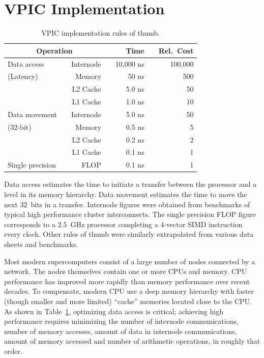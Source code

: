 \documentclass[journal,twoside]{IEEEtran}
\newcommand{\tbl}[1]{Table~\ref{tbl:#1}}
\begin{document}
\section{VPIC Implementation}

\begin{table}
\caption{VPIC implementation rules of thumb.}
\begin{center}
\begin{tabular}{l r r r r r r}
\hline
\hline
\multicolumn{3}{c}{Operation}  & & Time        & & Rel.~Cost \\
\hline
Data access      & & Internode & & 10,000   ns & &   100,000 \\
(Latency)        & &    Memory & &     50   ns & &       500 \\
                 & &  L2 Cache & &      5.0 ns & &        50 \\
\vspace{4pt}     & &  L1 Cache & &      1.0 ns & &        10 \\
Data movement    & & Internode & &      5.0 ns & &        50 \\
(32-bit)         & &    Memory & &      0.5 ns & &         5 \\
                 & &  L2 Cache & &      0.2 ns & &         2 \\
\vspace{4pt}     & &  L1 Cache & &      0.1 ns & &         1 \\
Single precision & &      FLOP & &      0.1 ns & &         1 \\
\hline
\end{tabular}
\end{center}

Data access estimates the time to initiate a transfer between the
processor and a level in its memory hierarchy.  Data movement
estimates the time to move the next $32$~bits in a transfer.
Internode figures were obtained from benchmarks of typical high
performance cluster interconnects.  The single precision FLOP figure
corresponds to a $2.5$~GHz processor completing a 4-vector SIMD
instruction every clock.  Other rules of thumb were similarly
extrapolated from various data sheets and benchmarks.
\label{tbl:rules-of-thumb}
\end{table}

Most modern supercomputers consist of a large number of nodes
connected by a network.  The nodes themselves contain one or more CPUs
and memory.  CPU performance has improved more rapidly than memory
performance over recent decades.  To compensate, modern CPU use a
deep memory hierarchy with faster (though smaller and more limited)
``cache'' memories located close to the CPU.  As shown in
\tbl{rules-of-thumb}, optimizing data access is critical; achieving
high performance requires minimizing the number of internode
communications, number of memory accesses, amount of data in internode
communications, amount of memory accessed and number of arithmetic
operations, in roughly that order.
\end{document}

